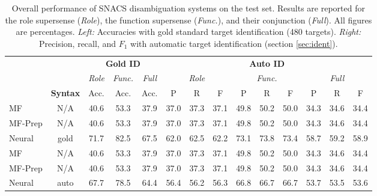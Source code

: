\begin{table}[]
	\centering\small
	\begin{tabular}{@{}lcccc<{\hspace{5pt}}ccc|ccc|ccc@{}}
                          &        & \multicolumn{3}{c}{\textbf{Gold ID}} & \multicolumn{9}{c}{\textbf{Auto ID}}                                                                                                                     \\
        \cmidrule(r){3-5}\cmidrule(l){6-14}
                          &         & \textit{Role}                        & \textit{Func.} & \textit{Full} & \multicolumn{3}{c}{\textit{Role}} & \multicolumn{3}{c}{\textit{Func.}} & \multicolumn{3}{c}{\textit{Full}}              \\
                          & \textbf{Syntax}       & Acc.                                 & Acc.           & Acc.          & P                                 & R                                  & F    & P    & R    & F    & P    & R    & F    \\
		\midrule
        MF & N/A  & 40.6 & 53.3 & 37.9 & 37.0 & 37.3 & 37.1 & 49.8 & 50.2 & 50.0 & 34.3 & 34.6 & 34.4 \\
        MF-Prep & N/A  & 40.6 & 53.3 & 37.9 & 37.0 & 37.3 & 37.1 & 49.8 & 50.2 & 50.0 & 34.3 & 34.6 & 34.4 \\        
        Neural        & gold & 71.7 & 82.5 & 67.5 & 62.0 & 62.5 & 62.2 & 73.1 & 73.8 & 73.4 & 58.7 & 59.2 & 58.9 \\
        \midrule
        MF & N/A  & 40.6 & 53.3 & 37.9 & 37.0 & 37.3 & 37.1 & 49.8 & 50.2 & 50.0 & 34.3 & 34.6 & 34.4 \\        
        MF-Prep & N/A  & 40.6 & 53.3 & 37.9 & 37.0 & 37.3 & 37.1 & 49.8 & 50.2 & 50.0 & 34.3 & 34.6 & 34.4 \\        
        Neural        & auto & 67.7 & 78.5 & 64.4 & 56.4 & 56.2 & 56.3 & 66.8 & 66.7 & 66.7 & 53.7 & 53.5 & 53.6 \\
	\end{tabular}
	\caption{\label{tab:overall} Overall performance of SNACS disambiguation systems on the test set. Results are reported for the role supersense ({\it Role}), the function supersense ({\it Func.}), and their conjunction ({\it Full}). All figures are percentages. 
    \textit{Left:} Accuracies with gold standard target identification (480 targets).
    \textit{Right:} Precision, recall, and $F_1$ with automatic target identification (section \ref{sec:ident}).} %
\end{table}


